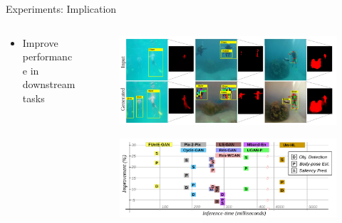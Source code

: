 \documentclass{cubeamer}
\begin{document}
\begin{frame}{Experiments: Implication}
    \begin{columns}
            \begin{column}{0.3\textwidth}
                \begin{itemize}
                    \item Improve performance in downstream tasks
                \end{itemize}
            \end{column}
            \begin{column}{0.6\textwidth}
                \begin{figure}
                    \centering
                    \includegraphics[width=1.0\columnwidth]{figures/result-7.PNG}
                \end{figure}
                \vspace{-0.5cm}
                \begin{figure}
                    \centering
                    \includegraphics[width=1.0\columnwidth]{figures/result-8.PNG}
                \end{figure}
            \end{column}
    \end{columns}
\end{frame}
\end{document}
